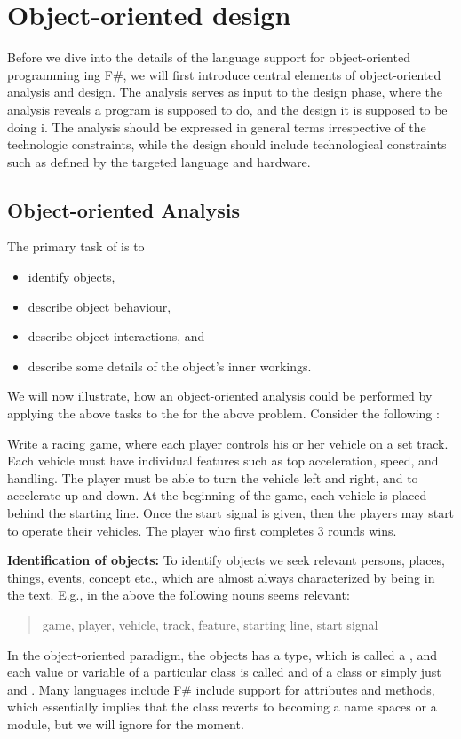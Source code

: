 \chapter{Object-oriented design}
\label{chap:ood}

Before we dive into the details of the language support for object-oriented programming ing F\#, we will first introduce central elements of object-oriented analysis and design. The analysis serves as input to the design phase, where the analysis reveals  a program is supposed to do, and the design  it is supposed to be doing i. The analysis should be expressed in general terms irrespective of the technologic constraints, while the design should include technological constraints such as defined by the targeted language and hardware. 

\section{Object-oriented Analysis}
The primary task of  is to 
\begin{itemize}
\item identify objects,
\item describe object behaviour,
\item describe object interactions, and 
\item describe some details of the object's inner workings.
\end{itemize}
We will now illustrate, how an object-oriented analysis could be performed by applying the above tasks to the for the above problem. Consider the following :
%
\begin{problem}
  Write a racing game, where each player controls his or her vehicle on a set track. Each vehicle must have individual features such as top acceleration, speed, and handling. The player must be able to turn the vehicle left and right, and to accelerate up and down. At the beginning of the game, each vehicle is placed behind the starting line. Once the start signal is given, then the players may start to operate their vehicles. The player who first completes 3 rounds wins.
\end{problem}
%
\textbf{Identification of objects:} To identify objects we seek relevant persons, places, things, events, concept etc., which are almost always characterized by being  in the text. E.g., in the above the following nouns seems relevant: 
\begin{quote}
  game, player, vehicle, track, feature, starting line, start signal
\end{quote}
In the object-oriented paradigm, the objects has a type, which is called a , and each value or variable of a particular class is called and  of a class or simply just and . Many languages include F\# include support for  attributes and methods, which essentially implies that the class reverts to becoming a name spaces or a module, but we will ignore for the moment. 

